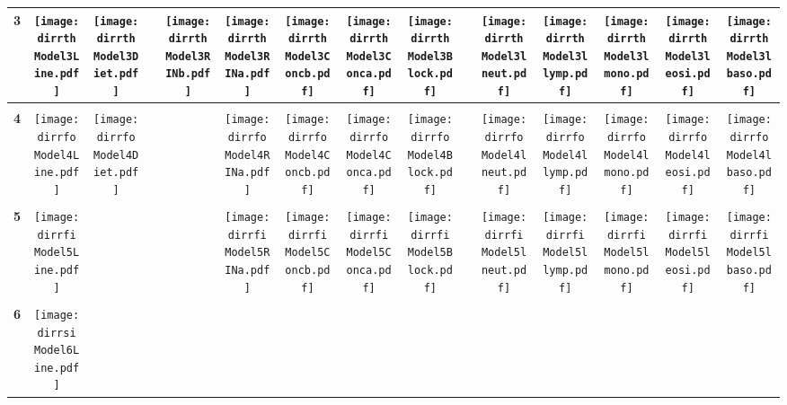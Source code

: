 \documentclass[landscape]{article}
\def \dirrth {U:/R/RA/Data/RFI-newdata/resultsimulation/ad/Model3.Line.Diet.Concb.RINb.Conca.RINa.lneut.llymp.lmono.leosi.lbaso.Block/}
\def \dirrfo {U:/R/RA/Data/RFI-newdata/resultsimulation/ad/Model4.Line.Diet.Concb.Conca.RINa.lneut.llymp.lmono.leosi.lbaso.Block/}
\def \dirrfi {U:/R/RA/Data/RFI-newdata/resultsimulation/ad/Model5.Line.Concb.Conca.RINa.lneut.llymp.lmono.leosi.lbaso.Block/}
\def \dirrsi{U:/R/RA/Data/RFI-newdata/resultsimulation/ad/Model6.Line.Concb.RINa.lneut.llymp.lmono.leosi.lbaso.Block/}
\begin{document}
\begin{table}
\begin{tabular}{ccccccccccccccc}
     \\[3.5pt]
      {\Huge \textbf{3}} 
      &\texttt{[image: \\dirrth Model3Line.pdf]}
      &\texttt{[image: \\dirrth Model3Diet.pdf]}
      &
      &\texttt{[image: \\dirrth Model3RINb.pdf]}
      &\texttt{[image: \\dirrth Model3RINa.pdf]}
      &\texttt{[image: \\dirrth Model3Concb.pdf]}
      &\texttt{[image: \\dirrth Model3Conca.pdf]}
      &\texttt{[image: \\dirrth Model3Block.pdf]}
      &
      &\texttt{[image: \\dirrth Model3lneut.pdf]}
      &\texttt{[image: \\dirrth Model3llymp.pdf]}
      &\texttt{[image: \\dirrth Model3lmono.pdf]}
      &\texttt{[image: \\dirrth Model3leosi.pdf]}
      &\texttt{[image: \\dirrth Model3lbaso.pdf]}
     \\[3.5pt]
     \hline
     \\[3.5pt]
     {\Huge \textbf{4}} 
      &\texttt{[image: \\dirrfo Model4Line.pdf]}
      &\texttt{[image: \\dirrfo Model4Diet.pdf]}
      &
      &
      &\texttt{[image: \\dirrfo Model4RINa.pdf]}
      &\texttt{[image: \\dirrfo Model4Concb.pdf]}
      &\texttt{[image: \\dirrfo Model4Conca.pdf]}
      &\texttt{[image: \\dirrfo Model4Block.pdf]}
      &
      &\texttt{[image: \\dirrfo Model4lneut.pdf]}
      &\texttt{[image: \\dirrfo Model4llymp.pdf]}
      &\texttt{[image: \\dirrfo Model4lmono.pdf]}
      &\texttt{[image: \\dirrfo Model4leosi.pdf]}
      &\texttt{[image: \\dirrfo Model4lbaso.pdf]}
     \\[3.5pt]
     \hline
     \\[3.5pt]
     {\Huge \textbf{5}} 
      &\texttt{[image: \\dirrfi Model5Line.pdf]}
      &
      &
      &
      &\texttt{[image: \\dirrfi Model5RINa.pdf]}
      &\texttt{[image: \\dirrfi Model5Concb.pdf]}
      &\texttt{[image: \\dirrfi Model5Conca.pdf]}
      &\texttt{[image: \\dirrfi Model5Block.pdf]}
      &
      &\texttt{[image: \\dirrfi Model5lneut.pdf]}
      &\texttt{[image: \\dirrfi Model5llymp.pdf]}
      &\texttt{[image: \\dirrfi Model5lmono.pdf]}
      &\texttt{[image: \\dirrfi Model5leosi.pdf]}
      &\texttt{[image: \\dirrfi Model5lbaso.pdf]}
     \\[3.5pt]
     \hline
     \\[3.5pt]
     {\Huge \textbf{6}} 
      &\texttt{[image: \\dirrsi Model6Line.pdf]}

\end{tabular}
\end{table}
\end{document}
